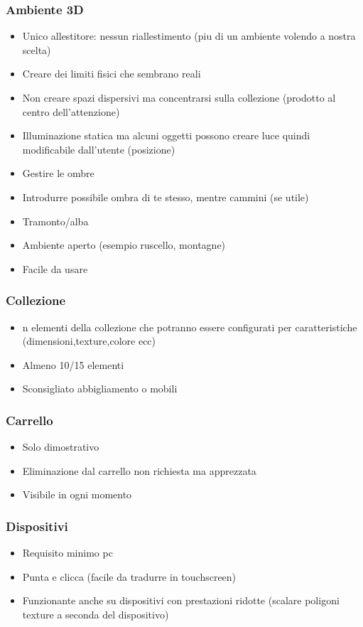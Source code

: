 \subsubsection{Ambiente 3D}
\begin{itemize}
    \item Unico allestitore: nessun riallestimento (piu di un ambiente volendo a nostra scelta)
    \item Creare dei limiti fisici che sembrano reali
    \item Non creare spazi dispersivi ma concentrarsi sulla collezione (prodotto al centro dell'attenzione)
    \item Illuminazione statica ma alcuni oggetti possono creare luce quindi modificabile dall'utente (posizione)
    \item Gestire le ombre
    \item Introdurre possibile ombra di te stesso, mentre cammini (se utile)
    \item Tramonto/alba
    \item Ambiente aperto (esempio ruscello, montagne)
    \item Facile da usare
\end{itemize}
\subsubsection{Collezione}
\begin{itemize}
    \item n elementi della collezione che potranno essere configurati per caratteristiche (dimensioni,texture,colore ecc)
    \item Almeno 10/15 elementi
    \item Sconsigliato abbigliamento o mobili
\end{itemize}
\subsubsection{Carrello}
\begin{itemize}
    \item Solo dimostrativo
    \item Eliminazione dal carrello non richiesta ma apprezzata
    \item Visibile in ogni momento
\end{itemize}
\subsubsection{Dispositivi}
\begin{itemize}
    \item Requisito minimo pc
    \item Punta e clicca (facile da tradurre in touchscreen)
    \item Funzionante anche su dispositivi con prestazioni ridotte (scalare poligoni texture a seconda del dispositivo)
\end{itemize}
